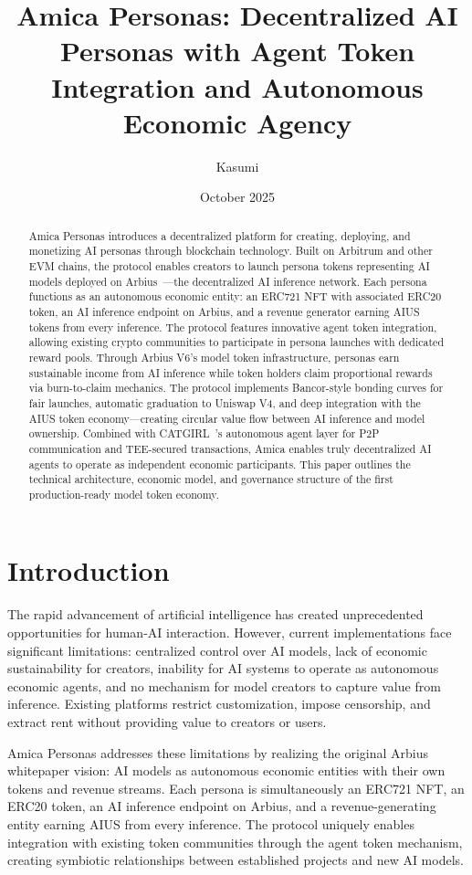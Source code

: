 \documentclass{article}
\title{Amica Personas: Decentralized AI Personas with Agent Token Integration and Autonomous Economic Agency}
\author{Kasumi}
\date{October 2025}
\begin{document}
\maketitle

\begin{abstract}
Amica Personas introduces a decentralized platform for creating, deploying, and monetizing AI personas through blockchain technology. Built on Arbitrum and other EVM chains, the protocol enables creators to launch persona tokens representing AI models deployed on Arbius~\cite{arbius2023}—the decentralized AI inference network. Each persona functions as an autonomous economic entity: an ERC721 NFT with associated ERC20 token, an AI inference endpoint on Arbius, and a revenue generator earning AIUS tokens from every inference. The protocol features innovative agent token integration, allowing existing crypto communities to participate in persona launches with dedicated reward pools. Through Arbius V6's model token infrastructure, personas earn sustainable income from AI inference while token holders claim proportional rewards via burn-to-claim mechanics. The protocol implements Bancor-style bonding curves for fair launches, automatic graduation to Uniswap V4, and deep integration with the AIUS token economy—creating circular value flow between AI inference and model ownership. Combined with CATGIRL~\cite{catgirl2025}'s autonomous agent layer for P2P communication and TEE-secured transactions, Amica enables truly decentralized AI agents to operate as independent economic participants. This paper outlines the technical architecture, economic model, and governance structure of the first production-ready model token economy.
\end{abstract}

\section{Introduction}

The rapid advancement of artificial intelligence has created unprecedented opportunities for human-AI interaction. However, current implementations face significant limitations: centralized control over AI models, lack of economic sustainability for creators, inability for AI systems to operate as autonomous economic agents, and no mechanism for model creators to capture value from inference. Existing platforms restrict customization, impose censorship, and extract rent without providing value to creators or users.

Amica Personas addresses these limitations by realizing the original Arbius whitepaper vision: AI models as autonomous economic entities with their own tokens and revenue streams. Each persona is simultaneously an ERC721 NFT, an ERC20 token, an AI inference endpoint on Arbius, and a revenue-generating entity earning AIUS from every inference. The protocol uniquely enables integration with existing token communities through the agent token mechanism, creating symbiotic relationships between established projects and new AI models.
\end{document}
